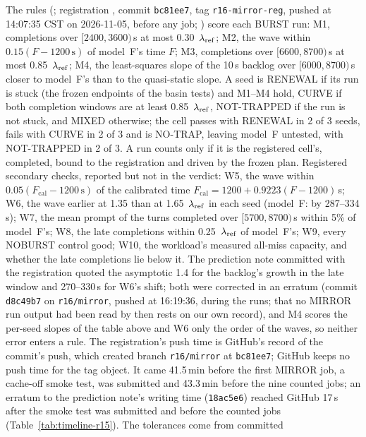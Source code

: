 The rules (; registration , commit
\texttt{bc81ee7}, tag \texttt{r16-mirror-reg}, pushed at 14:07:35 CST on 2026-11-05, before any job;
) score each BURST run: M1, completions over $[2400,3600)$\,s at most 0.30~$\lambda_{\mathrm{ref}}$; M2, the
wave within $0.15(F-1200\,\mathrm{s})$ of model~F's time $F$; M3, completions over $[6600,8700)$\,s at most 0.85~$\lambda_{\mathrm{ref}}$; M4, the
least-squares slope of the 10\,s backlog over $[6000,8700)$\,s closer to model~F's than to the quasi-static slope. A seed is RENEWAL
if its run is stuck (the frozen endpoints of the basin tests) and M1--M4 hold, CURVE if both completion windows are at least
0.85~$\lambda_{\mathrm{ref}}$, NOT-TRAPPED if the run is not stuck, and MIXED otherwise; the cell passes with RENEWAL in 2 of 3 seeds, fails with CURVE
in 2 of 3 and is NO-TRAP, leaving model~F untested, with NOT-TRAPPED in 2 of 3. A run counts only if it is the registered cell's,
completed, bound to the registration and driven by the frozen plan. Registered secondary checks, reported but not in the verdict:
W5, the wave within $0.05(F_{\mathrm{cal}}-1200\,\mathrm{s})$ of the calibrated time $F_{\mathrm{cal}}=1200+0.9223(F-1200)$\,s; W6,
the wave earlier at 1.35 than at 1.65~$\lambda_{\mathrm{ref}}$ in each seed (model~F: by 287--334\,s); W7, the mean prompt of the turns completed over
$[5700,8700)$\,s within 5\% of model~F's; W8, the late completions within 0.25~$\lambda_{\mathrm{ref}}$ of model~F's; W9, every NOBURST control good;
W10, the workload's measured all-miss capacity, and whether the late completions lie below it. The prediction note committed
with the registration quoted the asymptotic 1.4 for the backlog's growth in the late window and 270--330\,s for W6's shift; both
were corrected in an erratum (commit \texttt{d8c49b7} on \texttt{r16/mirror}, pushed at 16:19:36, during the runs; that no MIRROR run
output had been read by then rests on our own record), and M4 scores the per-seed slopes of the table above and W6 only the order of the waves, so neither error enters a
rule. The registration's push time is GitHub's record of the commit's push, which created branch \texttt{r16/mirror} at
\texttt{bc81ee7}; GitHub keeps no push time for the tag object. It came 41.5\,min before the first MIRROR job, a cache-off smoke
test, was submitted and 43.3\,min before the nine counted jobs; an erratum to the prediction note's writing time (\texttt{18ac5e6})
reached GitHub 17\,s after the smoke test was submitted and before the counted jobs (Table~\ref{tab:timeline-r15}). The tolerances come from committed
